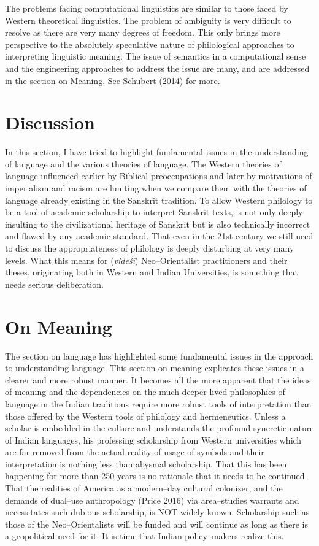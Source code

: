 The problems facing computational linguistics are similar to those faced by Western theoretical linguistics. The problem of ambiguity is very difficult to resolve as there are very many degrees of freedom. This only brings more perspective to the absolutely speculative nature of philological approaches to interpreting linguistic meaning. The issue of semantics in a computational sense and the engineering approaches to address the issue are many, and are addressed in the section on Meaning. See Schubert (2014) for more.


\section*{Discussion}

In this section, I have tried to highlight fundamental issues in the understanding of language and the various theories of language. The Western theories of language influenced earlier by Biblical preoccupations and later by motivations of imperialism and racism are limiting when we compare them with the theories of language already existing in the Sanskrit tradition. To allow Western philology to be a tool of academic scholarship to interpret Sanskrit texts, is not only deeply insulting to the civilizational heritage of Sanskrit but is also technically incorrect and flawed by any academic standard. That even in the 21st century we still need to discuss the appropriateness of philology is deeply disturbing at very many levels. What this means for (\textit{videśī}) Neo–Orientalist practitioners and their theses, originating both in Western and Indian Universities, is something that needs serious deliberation.


\section*{On Meaning}

The section on language has highlighted some fundamental issues in the approach to understanding language. This section on meaning explicates these issues in a clearer and more robust manner. It becomes all the more apparent that the ideas of meaning and the dependencies on the much deeper lived philosophies of language in the Indian traditions require more robust tools of interpretation than those offered by the Western tools of philology and hermeneutics. Unless a scholar is embedded in the culture and understands the profound syncretic nature of Indian languages, his professing scholarship from Western universities which are far removed from the actual reality of usage of symbols and their interpretation is nothing less than abysmal scholarship. That this has been happening for more than 250 years is no rationale that it needs to be continued. That the realities of America as a modern–day cultural colonizer, and the demands of dual–use anthropology (Price 2016) via area–studies warrants and necessitates such dubious scholarship, is NOT widely known. Scholarship such as those of the Neo–Orientalists will be funded and will continue as long as there is a geopolitical need for it. It is time that Indian policy–makers realize this.


